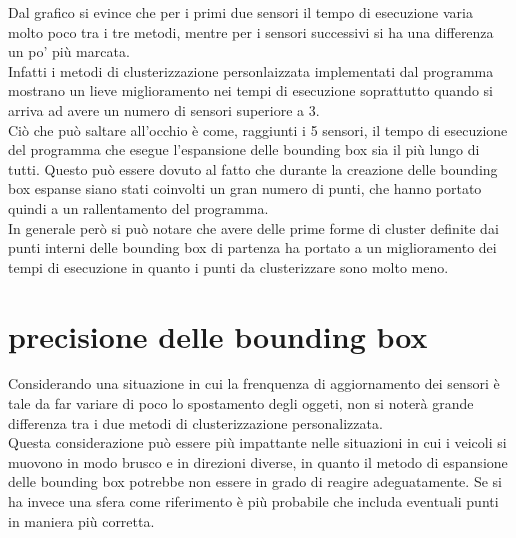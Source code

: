 \documentclass[italian]{report}
\begin{document}
Dal grafico si evince che per i primi due sensori il tempo di esecuzione varia molto poco tra i tre metodi, mentre per i sensori successivi si ha una differenza un po' più marcata.\\
Infatti i metodi di clusterizzazione personlaizzata implementati dal programma mostrano un lieve miglioramento nei tempi di esecuzione soprattutto quando si arriva ad avere un numero di sensori superiore a 3.\\ 
Ciò che può saltare all'occhio è come, raggiunti i 5 sensori, il tempo di esecuzione del programma che esegue l'espansione delle bounding box sia il più lungo di tutti. Questo può essere dovuto al fatto che durante la creazione delle bounding box espanse siano stati coinvolti un gran numero di punti, che hanno portato quindi a un rallentamento del programma.\\
In generale però si può notare che avere delle prime forme di cluster definite dai punti interni delle bounding box di partenza ha portato a un miglioramento dei tempi di esecuzione in quanto i punti da clusterizzare sono molto meno.
\section{precisione delle bounding box}
Considerando una situazione in cui la frenquenza di aggiornamento dei sensori è tale da far variare di poco lo spostamento degli oggeti, non si noterà grande differenza tra i due metodi di clusterizzazione personalizzata.\\
Questa considerazione può essere più impattante nelle situazioni in cui i veicoli si muovono in modo brusco e in direzioni diverse, in quanto il metodo di espansione delle bounding box potrebbe non essere in grado di reagire adeguatamente. Se si ha invece una sfera come riferimento è più probabile che includa eventuali punti in maniera più corretta.\\

\newpage
\end{document}

